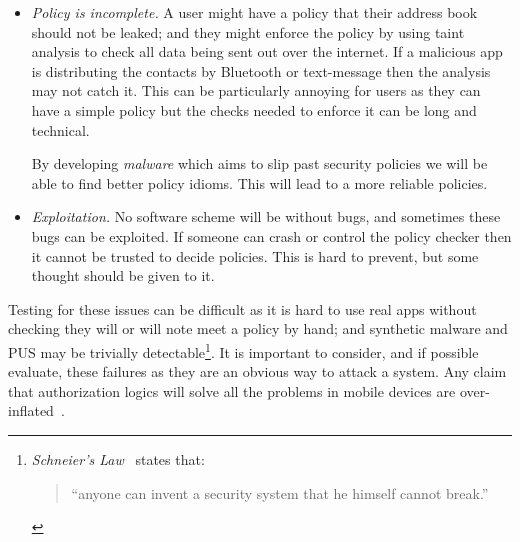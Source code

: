 \documentclass[a4paper,sfsidenotes]{%
  article%
}
\begin{document}
\begin{description}
\begin{itemize}
        This kind of failure will lead to decisions being authorized which
        shouldn't have been. How this affects the security of the device and
        knowing what must be done to recover from it is important for policies
        to be resiliant.  A variation of this might be an service which stops
        decisions being authorized.  For example, suppose a video streaming
        service bribed an antivirus service to say all its competitors were
        malicious.  Knowing how to recover from this (especially after a user
        may have installed the video streamer out of frustration) is not
        obvious\footnote{Though perhaps a similar solution to Microsoft's
        Internet Explorer being compelled to advertise alternatives might work
          well.}.

      \item \emph{Policy is incomplete.}  A user might have a policy that their
        address book should not be leaked; and they might enforce the policy by
        using taint analysis to check all data being sent out over the internet.
        If a malicious app is distributing the contacts by Bluetooth or
        text-message then the analysis may not catch it.  This can be
        particularly annoying for users as they can have a simple policy but the
        checks needed to enforce it can be long and technical.

        By developing \emph{malware} which aims to slip past security
        policies we will be able to find better policy idioms.  This will lead
        to a more reliable policies.

      \item \emph{Exploitation.}  No software scheme will be without bugs, and
        sometimes these bugs can be exploited.  If someone can crash or control
        the policy checker then it cannot be trusted to decide policies.
        This is hard to prevent, but some thought should be given to it.
    
    \end{itemize}
  
    Testing for these issues can be difficult as it is hard to use real apps
    without checking they will or will note meet a policy by hand; and synthetic
    malware and \ac{PUS} may be trivially detectable\footnote{\emph{Schneier's
    Law}~\cite{Schneier:ws} states that: \begin{quote}``anyone can invent a security
      system that he himself cannot break.''\end{quote}}.  It is important to
    consider, and if possible evaluate, these failures as they are an obvious
    way to attack a system.  Any claim that authorization logics will solve all
    the problems in mobile devices are over-inflated~\cite{Kruger:1999dd}.

\end{description}
\end{document}
